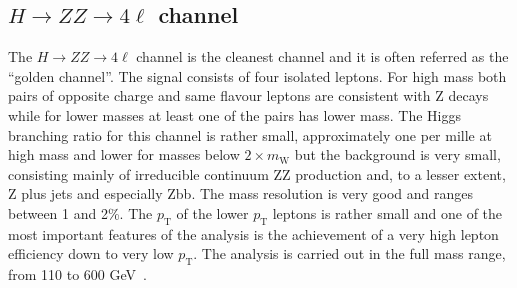 \documentclass{cimento}
\newcommand{\MW}{\ensuremath{m_{\mathrm{W}}}\xspace}
\newcommand{\pt}{\ensuremath{p_{\mathrm{T}}}\xspace}
\begin{document}




%
%
\subsection{$H \to ZZ \to 4\ell$ channel}

The $H \to ZZ \to 4\ell$ channel is the cleanest channel and it is
often referred as the ``golden channel''.  The signal consists of four
isolated leptons. For high mass both pairs of opposite charge and same
flavour leptons are consistent with Z decays while for lower masses at
least one of the pairs has lower mass.  The Higgs branching ratio for
this channel is rather small, approximately one per mille at high mass
and lower for masses below $2\times\MW$ but the background is very
small, consisting mainly of irreducible continuum ZZ production and,
to a lesser extent, Z plus jets and especially Zbb.  The mass
resolution is very good and ranges between 1 and 2\%.  The \pt of the
lower \pt leptons is rather small and one of the most important
features of the analysis is the achievement of a very high lepton
efficiency down to very low \pt.  The analysis is carried out in the
full mass range, from 110 to 600 GeV~\cite{Chatrchyan:2012dg}.
\end{document}
